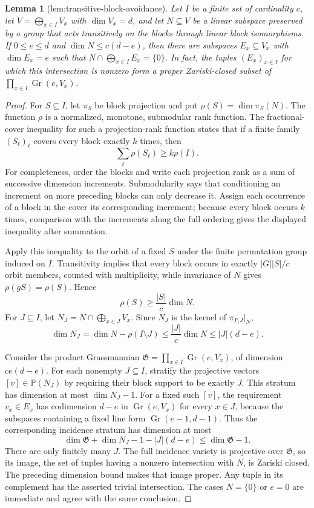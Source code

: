 \documentclass{article}
\newtheorem{lemma}{Lemma}
\begin{document}
\begin{lemma}[lem:transitive-block-avoidance]\label{lem:transitive-block-avoidance}
Let \(I\) be a finite set of cardinality \(c\), let \(V=\bigoplus_{x\in I}V_x\) with \(\dim V_x=d\), and let \(N\subseteq V\) be a linear subspace preserved by a group that acts transitively on the blocks through linear block isomorphisms. If \(0\le e\le d\) and \(\dim N\le c(d-e)\), then there are subspaces \(E_x\subseteq V_x\) with \(\dim E_x=e\) such that \(N\cap\bigoplus_{x\in I}E_x=\{0\}\). In fact, the tuples \((E_x)_{x\in I}\) for which this intersection is nonzero form a proper Zariski-closed subset of \(\prod_{x\in I}\operatorname{Gr}(e,V_x)\).
\end{lemma}
\begin{proof}
For \(S\subseteq I\), let \(\pi_S\) be block projection and put \(\rho(S)=\dim\pi_S(N)\). The function \(\rho\) is a normalized, monotone, submodular rank function. The fractional-cover inequality for such a projection-rank function states that if a finite family \((S_\ell)_\ell\) covers every block exactly \(k\) times, then
\[
\sum_\ell\rho(S_\ell)\ge k\rho(I).
\]
For completeness, order the blocks and write each projection rank as a sum of successive dimension increments. Submodularity says that conditioning an increment on more preceding blocks can only decrease it. Assign each occurrence of a block in the cover its corresponding increment; because every block occurs \(k\) times, comparison with the increments along the full ordering gives the displayed inequality after summation.

Apply this inequality to the orbit of a fixed \(S\) under the finite permutation group induced on \(I\). Transitivity implies that every block occurs in exactly \(|G||S|/c\) orbit members, counted with multiplicity, while invariance of \(N\) gives \(\rho(gS)=\rho(S)\). Hence
\[
\rho(S)\ge\frac{|S|}{c}\dim N.
\]
For \(J\subseteq I\), let \(N_J=N\cap\bigoplus_{x\in J}V_x\). Since \(N_J\) is the kernel of \(\pi_{I\setminus J}|_N\),
\[
\dim N_J=\dim N-\rho(I\setminus J)\le\frac{|J|}{c}\dim N\le |J|(d-e).
\]

Consider the product Grassmannian \(\mathfrak G=\prod_{x\in I}\operatorname{Gr}(e,V_x)\), of dimension \(ce(d-e)\). For each nonempty \(J\subseteq I\), stratify the projective vectors \([v]\in\mathbb P(N_J)\) by requiring their block support to be exactly \(J\). This stratum has dimension at most \(\dim N_J-1\). For a fixed such \([v]\), the requirement \(v_x\in E_x\) has codimension \(d-e\) in \(\operatorname{Gr}(e,V_x)\) for every \(x\in J\), because the subspaces containing a fixed line form \(\operatorname{Gr}(e-1,d-1)\). Thus the corresponding incidence stratum has dimension at most
\[
\dim\mathfrak G+\dim N_J-1-|J|(d-e)\le\dim\mathfrak G-1.
\]
There are only finitely many \(J\). The full incidence variety is projective over \(\mathfrak G\), so its image, the set of tuples having a nonzero intersection with \(N\), is Zariski closed. The preceding dimension bound makes that image proper. Any tuple in its complement has the asserted trivial intersection. The cases \(N=\{0\}\) or \(e=0\) are immediate and agree with the same conclusion.
\end{proof}
\end{document}
